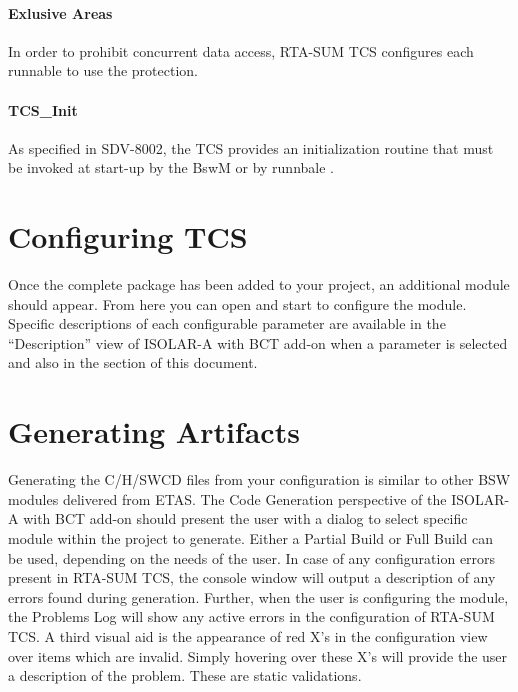 \paragraph{Exlusive Areas}
 In order to prohibit concurrent data access, RTA-SUM TCS configures each runnable \newline to use the  protection.
 
\paragraph{TCS\_Init}
 As specified in SDV-8002, the TCS provides an initialization routine  that must be invoked at start-up by the BswM or by runnbale .

\section{Configuring TCS} 
Once the complete package has been added to your project, an additional module \LongName should appear.
From here you can open and start to configure the module.
Specific descriptions of each configurable parameter are available in the “Description” view of
ISOLAR-A with BCT add-on
when a parameter is selected and also in the section  of this document.

\section{Generating Artifacts}
Generating the C/H/SWCD files from your configuration is similar to other BSW modules delivered from ETAS.
The Code Generation perspective of the 
ISOLAR-A with BCT add-on
should present the user with a dialog to select specific module within the project to generate.
Either a Partial Build or Full Build can be used, depending on the needs of the user.
In case of any configuration errors present in RTA-SUM TCS, the console window will output a description of any errors found during generation.
Further, when the user is configuring the module, the Problems Log will show any active errors in the configuration of RTA-SUM TCS.
A third visual aid is the appearance of red X’s in the configuration view over items which are invalid.
Simply hovering over these X’s will provide the user a description of the problem.
These are static validations.

